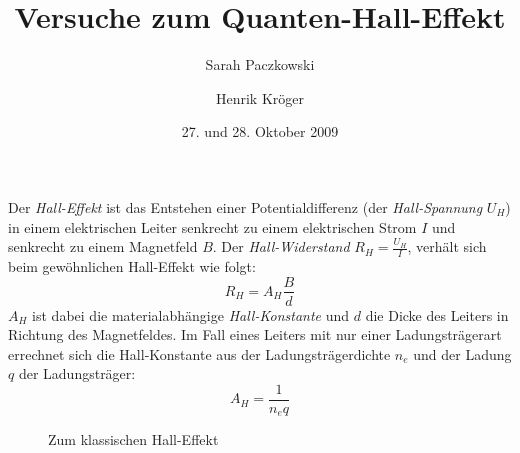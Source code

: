 \documentclass[a4paper]{article}
\begin{document}
\title{Versuche zum Quanten-Hall-Effekt}
\author{Sarah Paczkowski%
 \and Henrik Kröger%
}
\date{27. und 28. Oktober 2009}

\maketitle

\noindent
Der \emph{Hall-Effekt} ist das Entstehen einer Potentialdifferenz
(der \emph{Hall-Spannung} $U_H$)
in einem elektrischen Leiter senkrecht zu einem elektrischen Strom $I$ und
senkrecht zu einem Magnetfeld $B$.
Der \emph{Hall-Widerstand} $R_H = \frac{U_H}{I}$,
verhält sich beim gewöhnlichen Hall-Effekt wie folgt:
\begin{equation} R_H = A_H \frac{B}{d} \end{equation}
$A_H$ ist dabei die materialabhängige \emph{Hall-Konstante} und
$d$ die Dicke des Leiters in Richtung des Magnetfeldes.
Im Fall eines Leiters mit nur einer Ladungsträgerart errechnet sich
die Hall-Konstante aus der Ladungsträgerdichte $n_e$ und
der Ladung $q$ der Ladungsträger:
\begin{equation} A_H = \frac{1}{n_eq} \end{equation}

\begin{figure}[hb]
\begin{center}
\end{center}
\caption{Zum klassischen Hall-Effekt}
\end{figure}
\end{document}
